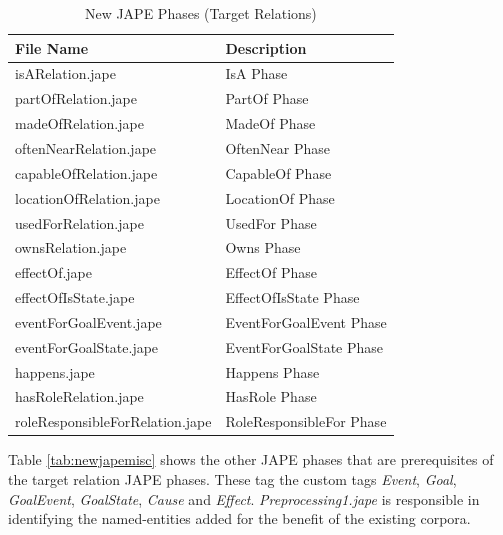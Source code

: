 \begin{table}[H]   %
\centering
\caption{New JAPE Phases (Target Relations)} \vspace{0.25em}
\begin{tabular}{|p{6cm}|p{5cm}|} \hline
\textbf{File Name} & \textbf{Description} \\ \hline
isARelation.jape					& IsA Phase \\ \hline
partOfRelation.jape					& PartOf Phase \\ \hline
madeOfRelation.jape					& MadeOf Phase \\ \hline
oftenNearRelation.jape				& OftenNear Phase \\ \hline
capableOfRelation.jape				& CapableOf Phase \\ \hline
locationOfRelation.jape				& LocationOf Phase \\ \hline
usedForRelation.jape				& UsedFor Phase \\ \hline
ownsRelation.jape 					& Owns Phase \\ \hline
effectOf.jape						& EffectOf Phase \\ \hline
effectOfIsState.jape				& EffectOfIsState Phase \\ \hline
eventForGoalEvent.jape				& EventForGoalEvent Phase \\ \hline
eventForGoalState.jape				& EventForGoalState Phase \\ \hline
happens.jape						& Happens Phase \\ \hline
hasRoleRelation.jape				& HasRole Phase \\ \hline
roleResponsibleForRelation.jape		& RoleResponsibleFor Phase \\ \hline
\end{tabular}
\label{tab:newjaperel}
\end{table}

Table \ref{tab:newjapemisc} shows the other JAPE phases that are prerequisites of the target relation JAPE phases. These tag the custom tags \textit{Event}, \textit{Goal}, \textit{GoalEvent}, \textit{GoalState}, \textit{Cause} and \textit{Effect}. \textit{Preprocessing1.jape} is responsible in identifying the named-entities added for the benefit of the existing corpora.

